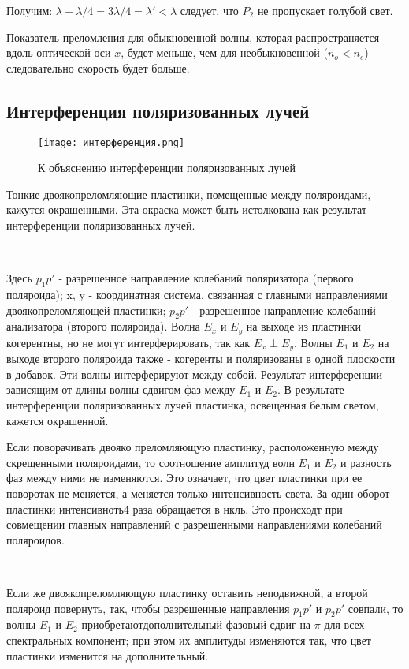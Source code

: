 \documentclass[12pt,a4paper]{article}
\begin{document}
Получим: $\lambda - \lambda/4 = 3\lambda/4 = \lambda' < \lambda $ следует, что $P_2$ не пропускает голубой свет. 

Показатель преломления для обыкновенной волны, которая распространяется вдоль оптической оси $x$, будет меньше, чем для необыкновенной ($n_o < n_e$) следовательно скорость будет больше.

\subsection{Интерференция поляризованных лучей}

\begin{wrapfigure}[13]{r}{130pt}
	\texttt{[image: интерференция.png]}
	\caption{К объяснению интерференции поляризованных лучей}
	\label{p10}
	\end{wrapfigure}


Тонкие двоякопреломляющие пластинки, помещенные между поляроидами, кажутся окрашенными. Эта окраска может быть истолкована как результат интерференции поляризованных лучей.

\

Здесь $p_1p'$ - разрешенное направление колебаний поляризатора (первого поляроида); x, y - координатная система, связанная с главными направлениями двоякопреломляющей пластинки; $p_2p'$ - разрешенное направление колебаний анализатора (второго поляроида). Волна $E_x$ и $E_y$ на выходе из пластинки когерентны, но не могут интерферировать, так как $E_x \perp E_y$. Волны $E_1$ и $E_2$ на выходе второго поляроида также - когеренты и поляризованы в одной плоскости в добавок. Эти волны интерферируют между собой. Результат интерференции зависящим от длины волны сдвигом фаз между $E_1$  и $E_2$. В результате интерференции поляризованных лучей пластинка, освещенная белым светом, кажется окрашенной.

Если поворачивать двояко преломляющую пластинку, расположенную между скрещенными поляроидами, то соотношение амплитуд волн $E_1$ и $E_2$ и разность фаз между ними не изменяются. Это означает, что цвет пластинки при ее поворотах не меняется, а меняется только интенсивность света. За один оборот пластинки интенсивноть4 раза обращается в нкль. Это происходт при совмещении главных направлений с разрешенными направлениями колебаний поляроидов.

\

Если же двоякопреломляющую пластинку оставить неподвижной, а второй поляроид повернуть, так, чтобы разрешенные направления $p_1p'$ и $p_2p'$ совпали, то волны $E_1$ и $E_2$ приобретаютдополнительный фазовый сдвиг на $\pi$ для всех спектральных компонент; при этом их амплитуды изменяются так, что цвет пластинки изменится на дополнительный.
\end{document}
